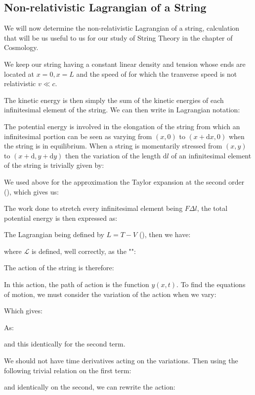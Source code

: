 	
	\subsection{Non-relativistic Lagrangian of a String}
	We will now determine the non-relativistic Lagrangian of a string, calculation that will be us useful to us for our study of String Theory in the chapter of Cosmology.
	
	We keep our string having a constant linear density and tension whose ends are located at $x=0,x=L$ and the speed of for which the tranverse speed is not relativistic $v\ll c$.
	
	The kinetic energy is then simply the sum of the kinetic energies of each infinitesimal element of the string. We can then write in Lagrangian notation:
	
	The potential energy is involved in the elongation of the string from which an infinitesimal portion can be seen as varying from $(x, 0)$ to $(x+\mathrm{d}x,0)$ when the string is in equilibrium. When a string is momentarily stressed from $(x, y)$ to $(x+\mathrm{d},y+\mathrm{d}y)$ then the variation of the length $\mathrm{d}l$ of an infinitesimal element of the string is trivially given by:
	
	We used above for the approximation the Taylor expansion at the second order (), which gives us:
	
	The work done to stretch every infinitesimal element being $F\Delta l$, the total potential energy is then expressed as:
	
	The Lagrangian being defined by $L=T-V$ (), then we have:
	
	where $\mathcal{L}$ is defined, well correctly, as the "":
	
	The action of the string is therefore:
	
	In this action, the path of action is the function $y (x, t)$. To find the equations of motion, we must consider the variation of the action when we vary:
	
	Which gives:
	
	As:
	
	and this identically for the second term.

	We should not have time derivatives acting on the variations. Then using the following trivial relation on the first term:
	
	and identically on the second, we can rewrite the action:
	

